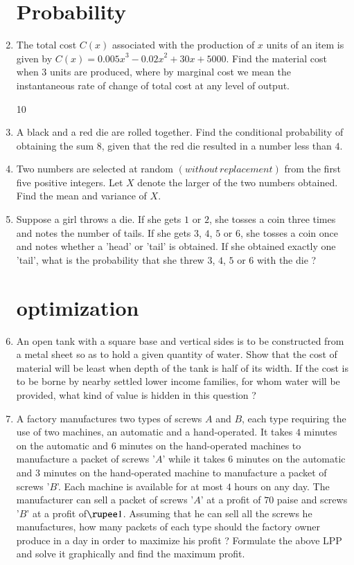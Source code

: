 \documentclass[10pt,-letter paper]{article}
\providecommand{\brak}[1]{\ensuremath{\left(#1\right)}}
\begin{document}
\begin{enumerate}
 \section{Probability}
\item The total cost $C\brak{x}$ associated with the production of $x$ units of an item is given by $C\brak{x} = {0.005x}^3-{0.02x}^2+30x+5000$. Find the material cost when $3$ units are produced, where by marginal cost we mean the instantaneous rate of change of total cost at any level of output.

		
10 \item A black and a red die are rolled together. Find the conditional probability of obtaining the sum $8$, given that the red die resulted in a number less than $4$.
\item Two numbers are selected at random \brak{without\hspace{2pt}replacement} from the first five positive integers. Let $X$ denote the larger of the two numbers obtained. Find the mean and variance of $X$.
\item  Suppose a girl throws a die. If she gets $1$ or $2$, she tosses a coin three times and notes the number of tails. If she gets $3$, $4$, $5$ or $6$, she tosses a coin once and notes whether a 'head' or 'tail' is obtained. If she obtained exactly one 'tail', what is the probability that she threw $3$, $4$, $5$ or $6$ with the die ? 
\section{optimization}
\item An open tank with a square base and vertical sides is to be constructed from a metal sheet so as to hold a given quantity of water. Show that the cost of material will be least when depth of the tank is half of its width. If the cost is to be borne by nearby settled lower income families, for whom water will be provided, what kind of value is hidden in this question ?

\item A factory manufactures two types of screws $A$ and $B$, each type requiring the use of two machines, an automatic and a hand-operated. It takes $4$ minutes on the automatic and $6$ minutes on the hand-operated machines to manufacture a packet of screws '$A$' while it takes $6$ minutes on the automatic and $3$ minutes on the hand-operated machine to manufacture a packet of screws '$B$'. Each machine is available for at most $4$ hours on any day. The manufacturer can sell a packet of screws '$A$' at a profit of $70$ paise and screws '$B$' at a profit of$\rupee 1$. Assuming that he can sell all the screws he manufactures, how many packets of each type should the factory owner produce in a day in order to maximize his profit ? Formulate the above LPP and solve it graphically and find the maximum profit.


\end{enumerate}
\end{document}
